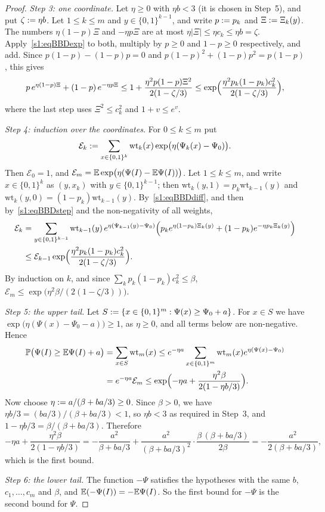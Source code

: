 \begin{proof}
\emph{Step 3: one coordinate.} Let $\eta\ge0$ with $\eta b<3$ (it is chosen
in Step~5), and put $\zeta\mathrel{:=}\eta b$. Let $1\le k\le m$ and
$y\in\{0,1\}^{k-1}$, and write $p\mathrel{:=} p_k$ and $\Xi\mathrel{:=}\Xi_k(y)$.
The numbers $\eta(1-p)\Xi$ and $-\eta p\Xi$ are at most
$\eta|\Xi|\le\eta c_k\le\eta b=\zeta$. Apply~\eqref{s1:eqBBDexp} to both,
multiply by $p\ge0$ and $1-p\ge0$ respectively, and add. Since
$p(1-p)-(1-p)p=0$ and $p(1-p)^2+(1-p)p^2=p(1-p)$, this gives
\begin{equation}\label{s1:eqBBDstep}
p\,e^{\eta(1-p)\Xi}+(1-p)\,e^{-\eta p\Xi}
\le1+\frac{\eta^2p(1-p)\Xi^2}{2(1-\zeta/3)}
\le\exp\Bigl(\frac{\eta^2p_k(1-p_k)c_k^2}{2(1-\zeta/3)}\Bigr),
\end{equation}
where the last step uses $\Xi^2\le c_k^2$ and $1+v\le e^v$.

\emph{Step 4: induction over the coordinates.} For $0\le k\le m$ put
\[
\mathcal{E}_k\mathrel{:=}\sum_{x\in\{0,1\}^k}\mathrm{wt}_k(x)\exp\bigl(\eta(\Psi_k(x)-\Psi_0)\bigr).
\]
Then $\mathcal{E}_0=1$, and $\mathcal{E}_m=\mathbb{E}\exp\bigl(\eta(\Psi(I)-\mathbb{E}\Psi(I))\bigr)$.
Let $1\le k\le m$, and write $x\in\{0,1\}^k$ as $(y,x_k)$ with
$y\in\{0,1\}^{k-1}$; then $\mathrm{wt}_k(y,1)=p_k\mathrm{wt}_{k-1}(y)$ and
$\mathrm{wt}_k(y,0)=(1-p_k)\mathrm{wt}_{k-1}(y)$. By~\eqref{s1:eqBBDdiff}, and then
by~\eqref{s1:eqBBDstep} and the non-negativity of all weights,
\begin{align*}
\mathcal{E}_k&=\sum_{y\in\{0,1\}^{k-1}}\mathrm{wt}_{k-1}(y)\,e^{\eta(\Psi_{k-1}(y)-\Psi_0)}
\Bigl(p_ke^{\eta(1-p_k)\Xi_k(y)}+(1-p_k)e^{-\eta p_k\Xi_k(y)}\Bigr)\\
&\le\mathcal{E}_{k-1}\exp\Bigl(\frac{\eta^2p_k(1-p_k)c_k^2}{2(1-\zeta/3)}\Bigr).
\end{align*}
By induction on $k$, and since $\sum_kp_k(1-p_k)c_k^2\le\beta$,
$\mathcal{E}_m\le\exp\bigl(\eta^2\beta/(2(1-\zeta/3))\bigr)$.

\emph{Step 5: the upper tail.} Let
$S\mathrel{:=}\{x\in\{0,1\}^m:\Psi(x)\ge\Psi_0+a\}$. For $x\in S$ we have
$\exp\bigl(\eta(\Psi(x)-\Psi_0-a)\bigr)\ge1$, as $\eta\ge0$, and all terms
below are non-negative. Hence
\begin{align*}
\mathbb{P}\bigl(\Psi(I)\ge\mathbb{E}\Psi(I)+a\bigr)&=\sum_{x\in S}\mathrm{wt}_m(x)
\le e^{-\eta a}\sum_{x\in\{0,1\}^m}\mathrm{wt}_m(x)e^{\eta(\Psi(x)-\Psi_0)}\\
&=e^{-\eta a}\mathcal{E}_m
\le\exp\Bigl(-\eta a+\frac{\eta^2\beta}{2(1-\eta b/3)}\Bigr).
\end{align*}
Now choose $\eta\mathrel{:=} a/(\beta+ba/3)\ge0$. Since $\beta>0$, we have
$\eta b/3=(ba/3)/(\beta+ba/3)<1$, so $\eta b<3$ as required in Step~3, and
$1-\eta b/3=\beta/(\beta+ba/3)$. Therefore
\[
-\eta a+\frac{\eta^2\beta}{2(1-\eta b/3)}
=-\frac{a^2}{\beta+ba/3}+\frac{a^2}{(\beta+ba/3)^2}\cdot\frac{\beta\,(\beta+ba/3)}{2\beta}
=-\frac{a^2}{2(\beta+ba/3)},
\]
which is the first bound.

\emph{Step 6: the lower tail.} The function $-\Psi$ satisfies the hypotheses
with the same $b$, $c_1,\dots,c_m$ and $\beta$, and
$\mathbb{E}(-\Psi(I))=-\mathbb{E}\Psi(I)$. So the first bound for $-\Psi$ is the second
bound for $\Psi$.
\end{proof}

